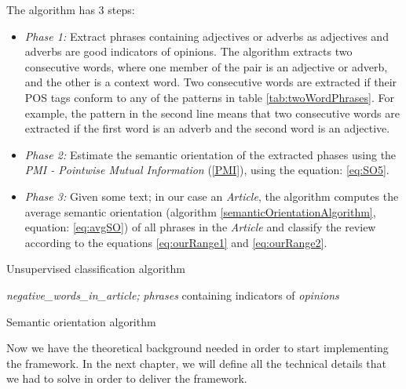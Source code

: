 The algorithm has 3 steps:
	\begin{itemize}
		\item \emph{Phase 1:} Extract phrases containing adjectives or adverbs as adjectives and adverbs are good indicators of opinions. The algorithm extracts two consecutive words, where one member of the pair is an adjective or adverb, and the other is a context word. Two consecutive words are extracted if their POS tags conform to any of the patterns in table \ref{tab:twoWordPhrases}. For example, the pattern in the second line means that two consecutive words are extracted if the first word is an adverb and the second word is an adjective.
		\item \emph{Phase 2:} Estimate the semantic orientation of the extracted phases using the \emph{PMI - Pointwise Mutual Information} (\ref{PMI}), using the equation: \ref{eq:SO5}. 
		\item \emph{Phase 3:} Given some text; in our case an \emph{Article}, the algorithm computes the average semantic orientation (algorithm \ref{semanticOrientationAlgorithm}, equation: \ref{eq:avgSO}) of all phrases in the \emph{Article} and classify the review according to the equations  \ref{eq:ourRange1} and \ref{eq:ourRange2}.
	\end{itemize}

\begin{algorithm}
\caption{Unsupervised classification algorithm}\label{unsupervisedAlgorithm}
\begin{algorithmic}[1]
\STATE {}
\STATE {}
\STATE {}
\STATE {}

\STATE {} \emph{negative\_words\_in\_article;}
\STATE {}
	\STATE {} \emph{phrases} containing indicators of \emph{opinions}
\STATE {}
		\STATE {}
	\ENDFOR
\STATE {}
	\STATE {}
\STATE {}
\end{algorithmic}
\end{algorithm}

\begin{algorithm}
\caption{Semantic orientation algorithm}\label{semanticOrientationAlgorithm}
\begin{algorithmic}[1]
\STATE {}
\STATE {}
	\STATE {}
	\STATE {}
	\ENDIF
	\STATE {}
	\STATE {}
	\ENDIF
\ENDFOR
\RETURN {}
\end{algorithmic}
\end{algorithm}

Now we have the theoretical background needed in order to start implementing the framework. In the next chapter, we will define all the technical details that we had to solve in order to deliver the framework.
